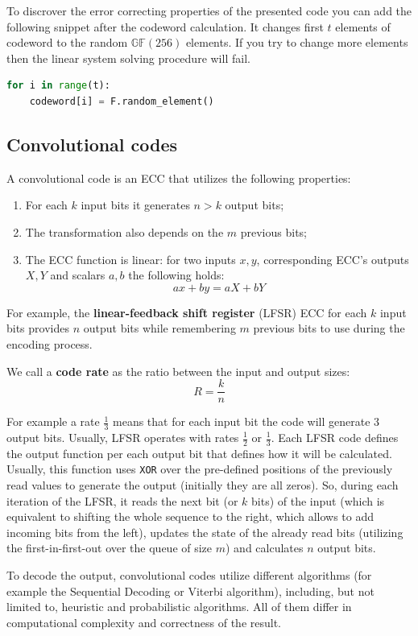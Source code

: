 \documentclass[../lecture-notes-148x210.tex]{subfiles}
\begin{document}
To discrover the error correcting properties of the presented code you can add the following snippet after the 
codeword calculation. It changes first $t$ elements of codeword to the random $\mathbb{GF}(256)$ elements. If you try 
to change more elements then the linear system solving procedure will fail. 
\begin{lstlisting}[language=Python,numbers=none]
for i in range(t):
    codeword[i] = F.random_element()
\end{lstlisting}

\subsection{Convolutional codes}
A convolutional code is an ECC that utilizes the following properties:
\begin{enumerate}
\item[--] For each $k$ input bits it generates $n>k$ output bits;
\item[--] The transformation also depends on the $m$ previous bits;
\item[--] The ECC function is linear: for two inputs $x, y$, corresponding ECC's outputs $X, Y$ and scalars $a,b$ the 
following holds: 
\begin{equation*}
    ax + by = aX + bY
\end{equation*}
\end{enumerate}
For example, the \textbf{linear-feedback shift register} (LFSR) ECC for each $k$ input bits provides $n$ output bits 
while remembering $m$ previous bits to use during the encoding process.
\begin{definition}
 We call a \textbf{code rate} as the ratio between the input and output sizes:
\begin{equation*}
    R = \frac{k}{n}
\end{equation*}
\end{definition}
For example a rate $\frac{1}{3}$ means that for each input bit the code will generate $3$ output bits. Usually, LFSR 
operates with rates $\frac{1}{2}$ or $\frac{1}{3}$. Each LFSR code defines the output function per each output bit that 
defines how it will be calculated. Usually, this function uses \verb|XOR| over the pre-defined positions of the 
previously read values to generate the output (initially they are all zeros). So, during each iteration of the LFSR, 
it reads the next bit (or $k$ bits) of the input (which is equivalent to shifting the whole sequence to the right, 
which allows to add incoming bits from the left), updates the state of the already read bits (utilizing the 
first-in-first-out over the queue of size $m$) and calculates $n$ output bits.

To decode the output, convolutional codes utilize different algorithms (for example the Sequential Decoding or Viterbi 
algorithm), including, but not limited to, heuristic and probabilistic algorithms. All of them differ in computational 
complexity and correctness of the result.
\end{document}

